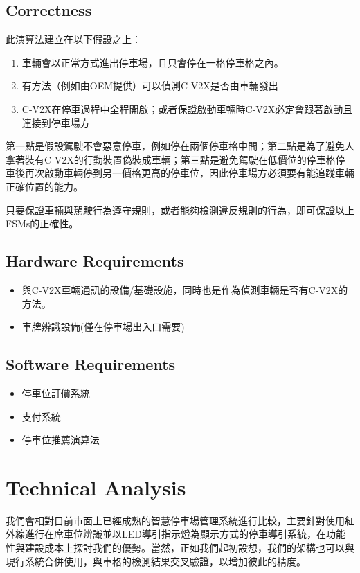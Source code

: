 \documentclass[sigconf,authorversion,nonacm,screen]{acmart}
\begin{document}
\subsection{Correctness}

\quad 此演算法建立在以下假設之上：
\begin{enumerate}
    \item 車輛會以正常方式進出停車場，且只會停在一格停車格之內。
    \item 有方法（例如由OEM提供）可以偵測C-V2X是否由車輛發出
    \item C-V2X在停車過程中全程開啟；或者保證啟動車輛時C-V2X必定會跟著啟動且連接到停車場方
\end{enumerate}

第一點是假設駕駛不會惡意停車，例如停在兩個停車格中間；第二點是為了避免人拿著裝有C-V2X的行動裝置偽裝成車輛；第三點是避免駕駛在低價位的停車格停車後再次啟動車輛停到另一價格更高的停車位，因此停車場方必須要有能追蹤車輛正確位置的能力。

只要保證車輛與駕駛行為遵守規則，或者能夠檢測違反規則的行為，即可保證以上FSMs的正確性。

\subsection{Hardware Requirements}

\begin{itemize}
    \item 與C-V2X車輛通訊的設備/基礎設施，同時也是作為偵測車輛是否有C-V2X的方法。
    \item 車牌辨識設備(僅在停車場出入口需要)
\end{itemize}

\subsection{Software Requirements}

\begin{itemize}
    \item 停車位訂價系統
    \item 支付系統
    \item 停車位推薦演算法
\end{itemize}

\section{Technical Analysis}

\quad 我們會相對目前市面上已經成熟的智慧停車場管理系統進行比較，主要針對使用紅外線進行在席車位辨識並以LED導引指示燈為顯示方式的停車導引系統，在功能性與建設成本上探討我們的優勢。當然，正如我們起初設想，我們的架構也可以與現行系統合併使用，與車格的檢測結果交叉驗證，以增加彼此的精度。
\end{document}
